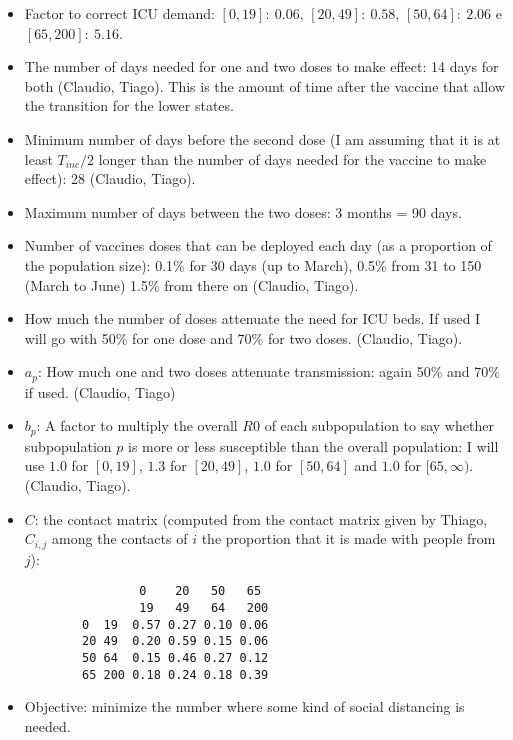 \documentclass{article}
\begin{document}
\begin{itemize}
    \item Factor to correct ICU demand: $[0, 19]:\ 0.06$, $[20, 49]:\ 0.58$,
    $[50, 64]:\ 2.06$ e $[65, 200]:\ 5.16$.
    
    \item The number of days needed for one and two doses to make effect: 14
    days for both (Claudio, Tiago). This is the amount of time after the vaccine
    that allow the transition for the lower states.
    
    \item Minimum number of days before the second dose (I am assuming that it
    is at least $T_{inc} / 2$ longer than the number of days needed for the
    vaccine to make effect): 28 (Claudio, Tiago).

    \item Maximum number of days between the two doses: 3 months = 90 days.
    
    \item Number of vaccines doses that can be deployed each day (as a
    proportion of the population size): 0.1\% for 30 days (up to March), 0.5\%
    from 31 to 150 (March to June)  1.5\% from there on (Claudio, Tiago).
    
    \item How much the number of doses attenuate the need for ICU beds. If used
    I will go with 50\% for one dose and 70\% for two doses. (Claudio, Tiago). 

    \item $a_p$: How much one and two doses attenuate transmission: again
    50\% and 70\% if used. (Claudio, Tiago)

    \item $b_p$: A factor to multiply the overall $R0$ of each subpopulation to
    say whether subpopulation $p$ is more or less susceptible than the overall
    population: {\color{red} I will use $1.0$ for $[0, 19]$, $1.3$ for $[20,
    49]$, $1.0$ for $[50, 64]$ and $1.0$ for $[65, \infty)$.} (Claudio, Tiago).

    \item $C$: the contact matrix (computed from the contact matrix given by Thiago, $C_{i, j}$ among the contacts of $i$ the proportion that it is made
    with people from $j$):

    \begin{verbatim}
                0    20   50   65
                19   49   64   200
        0  19  0.57 0.27 0.10 0.06
        20 49  0.20 0.59 0.15 0.06
        50 64  0.15 0.46 0.27 0.12
        65 200 0.18 0.24 0.18 0.39
    \end{verbatim}
    
    \item Objective: minimize the number where some kind of social distancing is
    needed.
\end{itemize}
\end{document}
